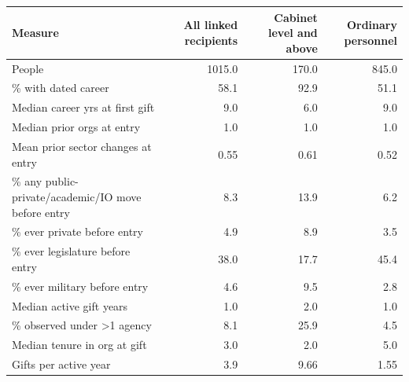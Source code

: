 \begin{tabular}{lrrr}
\toprule
Measure & All linked recipients & Cabinet level and above & Ordinary personnel \\
\midrule
People & 1015.0 & 170.0 & 845.0 \\
\% with dated career & 58.1 & 92.9 & 51.1 \\
Median career yrs at first gift & 9.0 & 6.0 & 9.0 \\
Median prior orgs at entry & 1.0 & 1.0 & 1.0 \\
Mean prior sector changes at entry & 0.55 & 0.61 & 0.52 \\
\% any public-private/academic/IO move before entry & 8.3 & 13.9 & 6.2 \\
\% ever private before entry & 4.9 & 8.9 & 3.5 \\
\% ever legislature before entry & 38.0 & 17.7 & 45.4 \\
\% ever military before entry & 4.6 & 9.5 & 2.8 \\
Median active gift years & 1.0 & 2.0 & 1.0 \\
\% observed under >1 agency & 8.1 & 25.9 & 4.5 \\
Median tenure in org at gift & 3.0 & 2.0 & 5.0 \\
Gifts per active year & 3.9 & 9.66 & 1.55 \\
\bottomrule
\end{tabular}
\par{}

